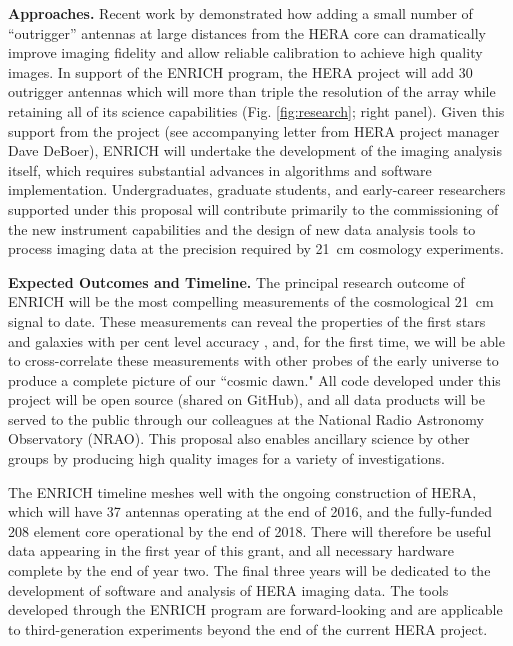 \documentclass[preprint,11pt]{aastex}
\begin{document}
\vspace{8pt}
\textbf{Approaches.} Recent work by \cite{dillon_and_parsons_2016} demonstrated how adding a small number of ``outrigger'' antennas at large distances from the HERA core can dramatically improve imaging fidelity and allow reliable calibration to achieve high quality images.  In support of the ENRICH program, the HERA project will add 30 outrigger antennas which will more than triple the resolution of the  array while retaining all of its science capabilities (Fig. \ref{fig:research}; right panel). Given this support from the project (see accompanying letter from HERA project manager Dave DeBoer), ENRICH will undertake the development of the imaging analysis itself, which requires substantial advances in algorithms and software implementation.  Undergraduates, graduate students, and early-career researchers supported under this proposal will contribute primarily to the commissioning of the new instrument capabilities and the design of new data analysis tools to process imaging data at the precision required by 21\, cm cosmology experiments.

\vspace{8pt}
\textbf{Expected Outcomes and Timeline.} The principal research outcome of ENRICH will be the most compelling measurements of the cosmological 21\, cm signal to date.  These measurements can reveal the properties of the first stars and galaxies with per cent level accuracy \citep{pober_et_al_2014,greig_and_mesinger_2015,ewall-wice_et_al_2016}, and, for the first time, we will be able to cross-correlate these measurements with other probes of the early universe to produce a complete picture of our ``cosmic dawn."  All code developed under this project will be open source (shared on GitHub), and all data products will be served to the public through our colleagues at the National Radio Astronomy Observatory (NRAO).  This proposal also enables ancillary science by other groups by producing high quality images for a variety of investigations.

The ENRICH timeline meshes well with the ongoing construction of HERA, which will have 37 antennas operating at the end of 2016, and the fully-funded 208 element core operational by the end of 2018.  There will therefore be useful data appearing in the first year of this grant, and all necessary hardware complete by the end of year two.  The final three years will be dedicated to the development of software and analysis of HERA imaging data.  The tools developed through the ENRICH program are forward-looking and are applicable to third-generation experiments beyond the end of the current HERA project.
\end{document}
